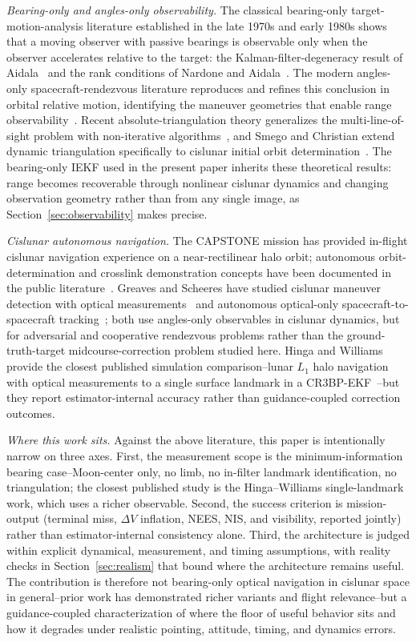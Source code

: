 \documentclass[10pt,twocolumn]{article}
\begin{document}
\emph{Bearing-only and angles-only observability.}  The classical bearing-only target-motion-analysis literature established in the late 1970s and early 1980s shows that a moving observer with passive bearings is observable only when the observer accelerates relative to the target: the Kalman-filter-degeneracy result of Aidala~\cite{aidala1979} and the rank conditions of Nardone and Aidala~\cite{nardone1981}.  The modern angles-only spacecraft-rendezvous literature reproduces and refines this conclusion in orbital relative motion, identifying the maneuver geometries that enable range observability~\cite{woffinden2009,gellerklein2014}.  Recent absolute-triangulation theory generalizes the multi-line-of-sight problem with non-iterative algorithms~\cite{henry2023}, and Smego and Christian extend dynamic triangulation specifically to cislunar initial orbit determination~\cite{smego2025}.  The bearing-only IEKF used in the present paper inherits these theoretical results: range becomes recoverable through nonlinear cislunar dynamics and changing observation geometry rather than from any single image, as Section~\ref{sec:observability} makes precise.

\emph{Cislunar autonomous navigation.}  The CAPSTONE mission has provided in-flight cislunar navigation experience on a near-rectilinear halo orbit; autonomous orbit-determination and crosslink demonstration concepts have been documented in the public literature~\cite{thompson2022}.  Greaves and Scheeres have studied cislunar maneuver detection with optical measurements~\cite{greaves2021} and autonomous optical-only spacecraft-to-spacecraft tracking~\cite{greaves2023}; both use angles-only observables in cislunar dynamics, but for adversarial and cooperative rendezvous problems rather than the ground-truth-target midcourse-correction problem studied here.  Hinga and Williams provide the closest published simulation comparison--lunar $L_1$ halo navigation with optical measurements to a single surface landmark in a CR3BP-EKF~\cite{hinga2023}--but they report estimator-internal accuracy rather than guidance-coupled correction outcomes.

\emph{Where this work sits.}  Against the above literature, this paper is intentionally narrow on three axes.  First, the measurement scope is the minimum-information bearing case--Moon-center only, no limb, no in-filter landmark identification, no triangulation; the closest published study is the Hinga--Williams single-landmark work, which uses a richer observable.  Second, the success criterion is mission-output (terminal miss, $\Delta V$ inflation, NEES, NIS, and visibility, reported jointly) rather than estimator-internal consistency alone.  Third, the architecture is judged within explicit dynamical, measurement, and timing assumptions, with reality checks in Section~\ref{sec:realism} that bound where the architecture remains useful.  The contribution is therefore not bearing-only optical navigation in cislunar space in general--prior work has demonstrated richer variants and flight relevance--but a guidance-coupled characterization of where the floor of useful behavior sits and how it degrades under realistic pointing, attitude, timing, and dynamics errors.
\end{document}
